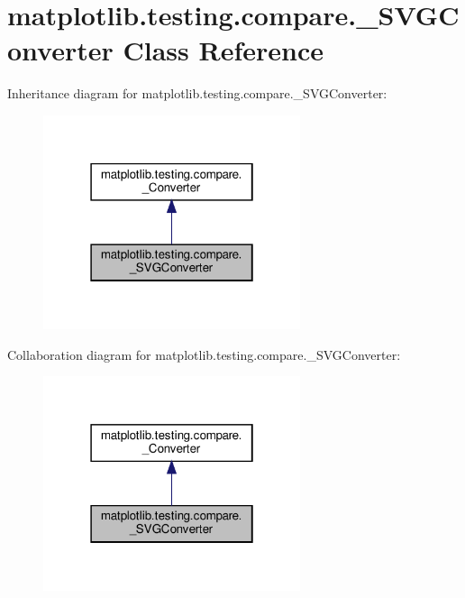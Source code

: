 \hypertarget{classmatplotlib_1_1testing_1_1compare_1_1__SVGConverter}{}\section{matplotlib.\+testing.\+compare.\+\_\+\+S\+V\+G\+Converter Class Reference}
\label{classmatplotlib_1_1testing_1_1compare_1_1__SVGConverter}


Inheritance diagram for matplotlib.\+testing.\+compare.\+\_\+\+S\+V\+G\+Converter\+:
\nopagebreak
\begin{figure}[H]
\begin{center}
\leavevmode
\includegraphics[width=214pt]{classmatplotlib_1_1testing_1_1compare_1_1__SVGConverter__inherit__graph}
\end{center}
\end{figure}


Collaboration diagram for matplotlib.\+testing.\+compare.\+\_\+\+S\+V\+G\+Converter\+:
\nopagebreak
\begin{figure}[H]
\begin{center}
\leavevmode
\includegraphics[width=214pt]{classmatplotlib_1_1testing_1_1compare_1_1__SVGConverter__coll__graph}
\end{center}
\end{figure}
